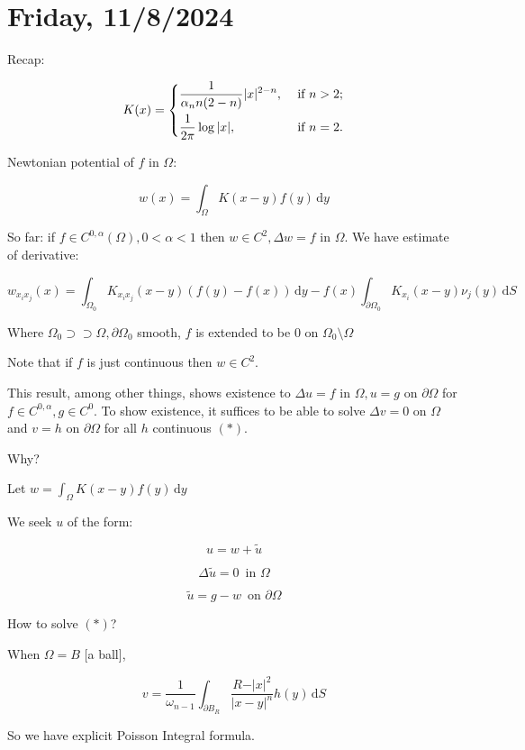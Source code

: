 \documentclass{article}
\theoremstyle{definition}
\begin{document}
\section*{Friday, 11/8/2024}

Recap:

\[
    K(x) = \begin{dcases}
        \frac{1}{\alpha_n n (2-n)}\vert x \vert ^{2 - n}, &\text{ if } n > 2 ;\\
        \frac{1}{2\pi} \log \vert x \vert, &\text{ if } n = 2.
    \end{dcases}
\]

Newtonian potential of \(f\) in \(\Omega\):

\[
    w(x) = \int_{\Omega} K(x-y) f(y) \,\mathrm{d}y 
\]

So far: if \(f\in C^{0,\alpha}(\Omega), 0 < \alpha < 1\) then \(w \in C^2, \Delta w = f\) in \(\Omega\). We have estimate of derivative:

\[
    w_{x_i x_j} (x) = \int_{\Omega_0} K_{x_i x_j}(x-y) (f(y) - f(x)) \,\mathrm{d}y - f(x) \int_{\partial \Omega_0} K_{x_i} (x-y) \nu_j (y) \,\mathrm{d}S 
\]

Where \(\Omega_0 \supset \supset \Omega, \partial \Omega_0\) smooth, \(f\) is extended to be \(0\) on \(\Omega_0 \setminus \Omega\) 

Note that if \(f\) is just continuous then \(w \in C^2\).

This result, among other things, shows existence to \(\Delta u = f\) in \(\Omega, u = g\) on \(\partial \Omega\) for \(f\in C^{0,\alpha}, g\in C^0\). To show existence, it suffices to be able to solve \(\Delta v = 0\) on \(\Omega\) and \(v = h\) on \(\partial \Omega\) for all \(h\) continuous \((\ast)\).

Why?

Let \(w = \int_{\Omega} K(x-y) f(y) \,\mathrm{d}y\)

We seek \(u\) of the form:

\[
    u = w + \widetilde{u}
\]

\[
    \Delta \widetilde{u} = 0 \, \text{ in } \Omega 
\]

\[
    \widetilde{u} = g - w \, \text{ on } \partial \Omega
\]

How to solve \((\ast)\)?

When \(\Omega = B\) [a ball],

\[
    v = \frac{1}{\omega_{n-1}}\int_{\partial B_R} \frac{R - \vert x \vert ^2}{\vert x-y \vert ^n} h(y) \,\mathrm{d}S
\]

So we have explicit Poisson Integral formula.
\end{document}
